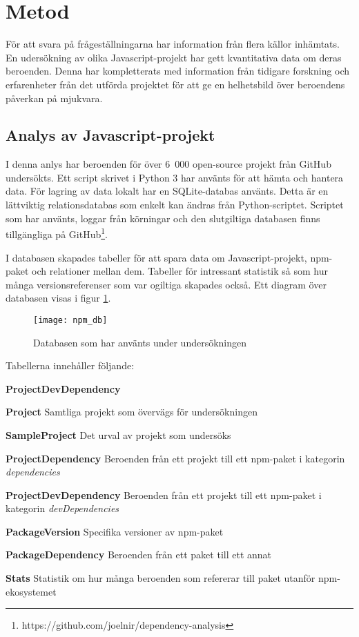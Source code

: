 \section{Metod}
\label{sec:joel_o-method}
För att svara på frågeställningarna har information från flera källor inhämtats. En udersökning av olika Javascript-projekt har gett kvantitativa data om deras beroenden. Denna har kompletterats med information från tidigare forskning och erfarenheter från det utförda projektet för att ge en helhetsbild över beroendens påverkan på mjukvara.

\subsection{Analys av Javascript-projekt}
\label{subsec:joel_o-method-analys}
I denna anlys har beroenden för över 6~000 open-source projekt från GitHub undersökts. Ett script skrivet i Python 3 har använts för att hämta och hantera data. För lagring av data lokalt har en SQLite-databas använts. Detta är en lättviktig relationsdatabas som enkelt kan ändras från Python-scriptet. Scriptet som har använts, loggar från körningar och den slutgiltiga databasen finns tillgängliga på GitHub\footnote{https://github.com/joelnir/dependency-analysis}.

I databasen skapades tabeller för att spara data om Javascript-projekt, npm-paket och relationer mellan dem. Tabeller för intressant statistik så som hur många versionsreferenser som var ogiltiga skapades också. Ett diagram över databasen visas i figur \ref{fig:dependency-db}.

\begin{figure}[ht]
  \centering
  \texttt{[image: npm\_db]}
  \caption{Databasen som har använts under undersökningen}
  \label{fig:dependency-db}
\end{figure}

Tabellerna innehåller följande:

\begin{labeling}{\textbf{ProjectDevDependency}}
  \item [\textbf{Project}] Samtliga projekt som övervägs för undersökningen
  \item [\textbf{SampleProject}] Det urval av projekt som undersöks
  \item [\textbf{ProjectDependency}] Beroenden från ett projekt till ett npm-paket i kategorin \textit{dependencies}
  \item [\textbf{ProjectDevDependency}] Beroenden från ett projekt till ett npm-paket i kategorin \textit{devDependencies}
  \item [\textbf{PackageVersion}] Specifika versioner av npm-paket
  \item [\textbf{PackageDependency}] Beroenden från ett paket till ett annat
  \item [\textbf{Stats}] Statistik om hur många beroenden som refererar till paket utanför npm-ekosystemet
\end{labeling}

